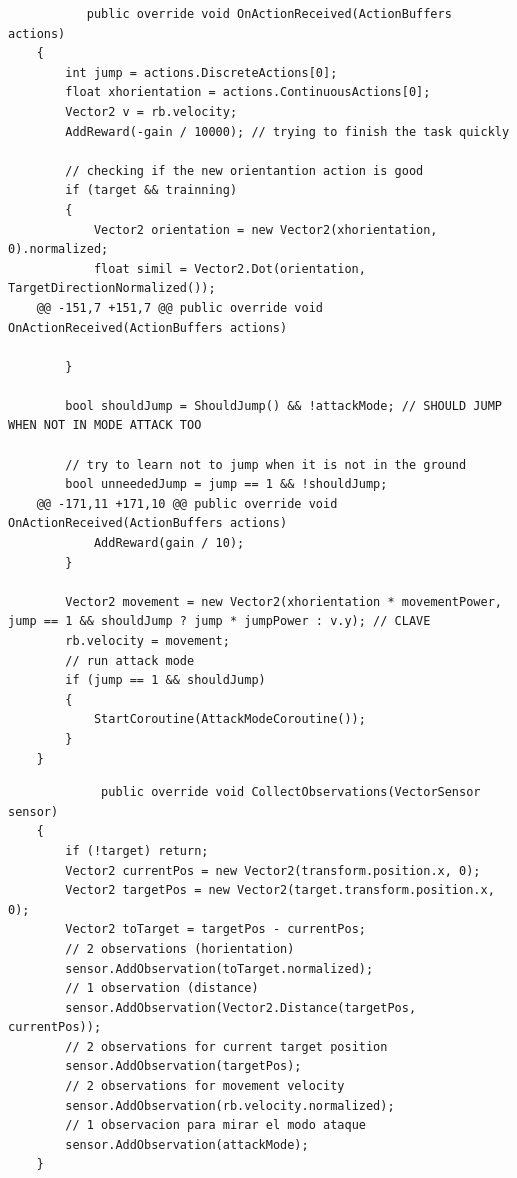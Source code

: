 \documentclass{article}
\begin{document}
     \begin{lstlisting}
           public override void OnActionReceived(ActionBuffers actions)
    {
        int jump = actions.DiscreteActions[0];
        float xhorientation = actions.ContinuousActions[0];
        Vector2 v = rb.velocity;
        AddReward(-gain / 10000); // trying to finish the task quickly 

        // checking if the new orientantion action is good
        if (target && trainning)
        {
            Vector2 orientation = new Vector2(xhorientation, 0).normalized;
            float simil = Vector2.Dot(orientation, TargetDirectionNormalized());
	@@ -151,7 +151,7 @@ public override void OnActionReceived(ActionBuffers actions)

        }

        bool shouldJump = ShouldJump() && !attackMode; // SHOULD JUMP WHEN NOT IN MODE ATTACK TOO

        // try to learn not to jump when it is not in the ground
        bool unneededJump = jump == 1 && !shouldJump;
	@@ -171,11 +171,10 @@ public override void OnActionReceived(ActionBuffers actions)
            AddReward(gain / 10);
        }

        Vector2 movement = new Vector2(xhorientation * movementPower, jump == 1 && shouldJump ? jump * jumpPower : v.y); // CLAVE
        rb.velocity = movement;
        // run attack mode
        if (jump == 1 && shouldJump)
        {
            StartCoroutine(AttackModeCoroutine());
        }
    }
     \end{lstlisting}
     
     \begin{lstlisting}
             public override void CollectObservations(VectorSensor sensor)
    {
        if (!target) return;
        Vector2 currentPos = new Vector2(transform.position.x, 0);
        Vector2 targetPos = new Vector2(target.transform.position.x, 0);
        Vector2 toTarget = targetPos - currentPos;
        // 2 observations (horientation)
        sensor.AddObservation(toTarget.normalized);
        // 1 observation (distance)
        sensor.AddObservation(Vector2.Distance(targetPos, currentPos));
        // 2 observations for current target position
        sensor.AddObservation(targetPos);
        // 2 observations for movement velocity
        sensor.AddObservation(rb.velocity.normalized);
        // 1 observacion para mirar el modo ataque
        sensor.AddObservation(attackMode);
    }
     \end{lstlisting}
     
\end{document}
